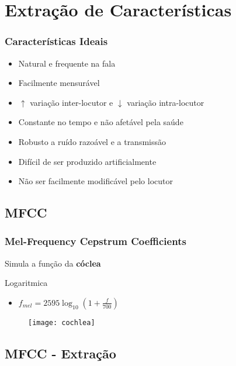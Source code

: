 \section{Extração de Características}
\label{sec:feature-extraction}

\contentscurrent

\begin{frame}
\frametitle{Características Ideais}
\begin{itemize}
    \item Natural e frequente na fala
    \pause
    \item Facilmente mensurável
    \pause
    \item $\uparrow$ variação inter-locutor e $\downarrow$ variação intra-locutor
    \pause
    \item Constante no tempo e não afetável pela saúde
    \pause
    \item Robusto a ruído razoável e a transmissão
    \pause
    \item Difícil de ser produzido artificialmente
    \pause
    \item Não ser facilmente modificável pelo locutor
\end{itemize}
\end{frame}

\subsection{MFCC}

\begin{frame}
\frametitle{Mel-Frequency Cepstrum Coefficients}
\begin{description}
    \item Simula a função da \textbf{cóclea}
    \pause
    \item[Escala Mel] Logaritmica
    \pause
    \begin{itemize}
        \item $f_{mel} = 2595 \log_{10}(1 + \frac{f}{700})$
        \pause
    \end{itemize}
\end{description}

\begin{figure}[ht]
    \centering
    \texttt{[image: cochlea]}
\end{figure}
\end{frame}

\subsection{MFCC - Extração}

